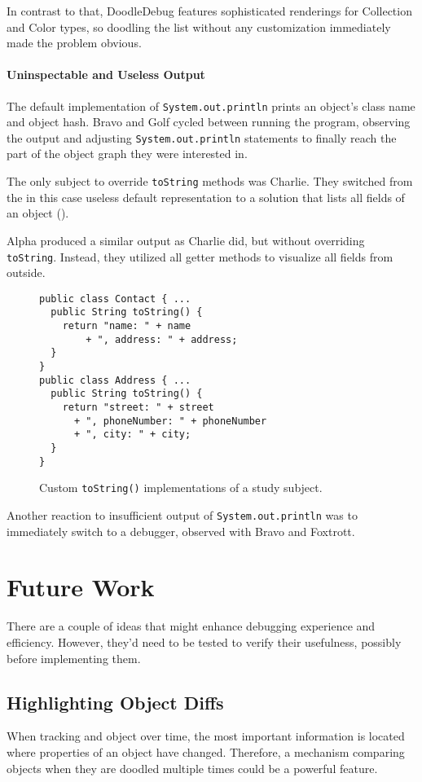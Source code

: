 \documentclass[english]{scrartcl}
\newcommand{\DD}{Dood\-le\-De\-bug\xspace}
\newcommand{\println}{\texttt{Sys\-tem.\-out.\-println}\xspace}
\begin{document}
In contrast to that, \DD features sophisticated renderings for Collection and Color types, so doodling the list without any customization immediately made the problem obvious.

\paragraph{Uninspectable and Useless Output}
The default implementation of \println prints an object's class name and object hash.
Bravo and Golf cycled between running the program, observing the output and adjusting \println statements to finally reach the part of the object graph they were interested in.

The only subject to override \texttt{toString} methods was Charlie.
They switched from the in this case useless default representation to a solution that lists all fields of an object ().

Alpha produced a similar output as Charlie did, but without overriding \texttt{toString}.
Instead, they utilized all getter methods to visualize all fields from outside.

\begin{figure}[h]
\begin{lstlisting}
public class Contact { ...
  public String toString() { 
    return "name: " + name 
        + ", address: " + address;
  }
}
public class Address { ...
  public String toString() {
    return "street: " + street
      + ", phoneNumber: " + phoneNumber
      + ", city: " + city;
  }
}
\end{lstlisting}
  \caption{Custom \texttt{toString()} implementations of a study subject.}
\end{figure}

Another reaction to insufficient output of \println was to immediately switch to a debugger, observed with Bravo and Foxtrott.

\section{Future Work}
There are a couple of ideas that might enhance debugging experience and efficiency.
However, they'd need to be tested to verify their usefulness, possibly before implementing them.

\subsection{Highlighting Object Diffs}
When tracking and object over time, the most important information is located where properties of an object have changed.
Therefore, a mechanism comparing objects when they are doodled multiple times could be a powerful feature.
\end{document}
